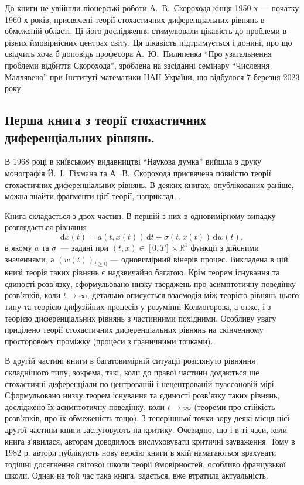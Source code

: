 \documentclass[11pt, reqno]{amsart}
\begin{document}
До книги не увійшли піонерські роботи А.~В.~Скорохода кінця {1950-х} --- початку {1960-х} років, присвячені теорії стохастичних диференціальних рівнянь в обмеженій області. Ці його дослідження стимулювали цікавість до проблеми в різних ймовірнісних центрах світу. Ця цікавість підтримується і донині, про що свідчить хоча б доповідь професора А.~Ю.~Пилипенка ``Про узагальнення проблеми відбиття Скорохода'', зроблена на засіданні семінару ``Числення Маллявена'' при Інституті математики НАН України, що відбулося 7 березня 2023 року.

\subsection{Перша книга з теорії стохастичних диференціальних рівнянь.}
В 1968 році в київському видавництві ``Наукова думка'' вийшла з друку монографія Й.~І.~Гіхмана   та А~.В.~Скорохода \cite{b11} присвячена повністю теорії стохастичних диференціальних рівнянь. В деяких книгах, опублікованих раніше, можна знайти фрагменти цієї теорії, наприклад, \cite{b9,b12,b13}.

Книга \cite{b11} складається з двох частин. В першій з них в одновимірному випадку розглядається рівняння
\[
\mathrm{d}x(t)=a(t,x(t))\,\mathrm{d}t+\sigma(t,x(t))\,\mathrm{d}w(t),
\]
в якому $a$ та $\sigma$~--- задані при $(t,x) \in [0,T]\times \mathbb{R}^1$  функції з дійсними значеннями, а $(w(t))_{t\geq 0}$ --- одновимірний вінерів процес. Викладена в цій книзі теорія таких рівнянь є надзвичайно багатою. Крім теорем існування та єдиності розв'язку, сформульовано низку тверджень про асимптотичну поведінку розв'язків, коли $t \rightarrow \infty$, детально описується взаємодія між теорією рівнянь цього типу та теорією дифузійних процесів у розумінні Колмогорова, а отже, і з теорією диференціальних рівнянь з частинними похідними. Особливу увагу приділено теорії стохастичних диференціальних рівнянь на скінченному просторовому проміжку (процеси з граничними точками).

В другій частині книги в багатовимірній ситуації розглянуто рівняння складнішого типу, зокрема, такі, коли до правої частини додаються ще стохастичні диференціали по центрованій і нецентрованій пуассоновій мірі. Сформульовано низку теорем існування та єдиності розв'язку таких рівнянь, досліджено їх асимптотичну поведінку, коли $t \rightarrow \infty$ (теореми про стійкість розв'язків, про їх обмеженість тощо). З теперішньої точки зору деякі місця цієї другої частини книги заслуговують на критику. Очевидно, що і в ті часи, коли книга з’явилася, авторам доводилось вислуховувати  критичні зауваження. Тому в 1982 р. автори публікують нову версію книги в якій намагаються врахувати тодішні досягнення світової школи теорії ймовірностей, особливо французької школи. Однак на той час така книга, здається, вже втратила актуальність.
\end{document}
